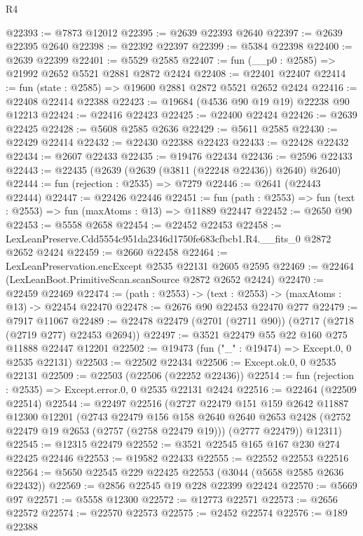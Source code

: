 \begin{lexlean}{R4}
\begin{coremodule}
@22393 := @7873 @12012
@22395 := @2639 @22393 @2640
@22397 := @2639 @22395 @2640
@22398 := @22392 @22397
@22399 := @5384 @22398
@22400 := @2639 @22399
@22401 := @5529 @2585
@22407 := fun (__p0 : @2585) => @21992 @2652 @5521 @2881 @2872 @2424
@22408 := @22401 @22407
@22414 := fun (state : @2585) => @19600 @2881 @2872 @5521 @2652 @2424
@22416 := @22408 @22414 @22388
@22423 := @19684 (@4536 @90 @19 @19) @22238 @90 @12213
@22424 := @22416 @22423
@22425 := @22400 @22424
@22426 := @2639 @22425
@22428 := @5608 @2585 @2636
@22429 := @5611 @2585
@22430 := @22429 @22414
@22432 := @22430 @22388 @22423
@22433 := @22428 @22432
@22434 := @2607 @22433
@22435 := @19476 @22434
@22436 := @2596 @22433
@22443 := @22435 (@2639 (@2639 (@3811 (@22248 @22436)) @2640) @2640)
@22444 := fun (rejection : @2535) => @7279
@22446 := @2641 (@22443 @22444)
@22447 := @22426 @22446
@22451 := fun (path : @2553) => fun (text : @2553) => fun (maxAtoms : @13) => @11889 @22447
@22452 := @2650 @90
@22453 := @5558 @2658
@22454 := @22452 @22453
@22458 := LexLeanPreserve.Cdd5554c951da2346d1750fe683cfbcb1.R4.__fits_0 @2872 @2652 @2424
@22459 := @2660 @22458
@22464 := LexLeanPreservation.encExcept @2535 @22131 @2605 @2595
@22469 := @22464 (LexLeanBoot.PrimitiveScan.scanSource @2872 @2652 @2424)
@22470 := @22459 @22469
@22474 := (path : @2553) -> (text : @2553) -> (maxAtoms : @13) -> @22454 @22470
@22478 := @2676 @90 @22453 @22470 @277
@22479 := @7917 @11067
@22489 := @22478 @22479 (@2701 (@2711 @90)) (@2717 (@2718 (@2719 @277) @22453 @2694))
@22497 := @3521 @22479 @55 @22 @160 @275 @11888 @22447 @12201
@22502 := @19473 (fun ("_" : @19474) => Except.{0, 0} @2535 @22131)
@22503 := @22502 @22434
@22506 := Except.ok.{0, 0} @2535 @22131
@22509 := @22503 (@22506 (@22252 @22436))
@22514 := fun (rejection : @2535) => Except.error.{0, 0} @2535 @22131 @2424
@22516 := @22464 (@22509 @22514)
@22544 := @22497
    @22516
    (@2727
      @22479
      @151
      @159
      @2642
      @11887
      @12300
      @12201
      (@2743
        @22479
        @156
        @158
        @2640
        @2640
        @2653
        @2428
        (@2752 @22479 @19 @2653 (@2757 (@2758 @22479 @19)))
        (@2777 @22479))
      @12311)
@22545 := @12315 @22479
@22552 := @3521 @22545 @165 @167 @230 @274 @22425 @22446
@22553 := @19582 @22433
@22555 := @22552 @22553 @22516
@22564 := @5650 @22545 @229 @22425 @22553 (@3044 (@5658 @2585 @2636 @22432))
@22569 := @2856 @22545 @19 @228 @22399 @22424
@22570 := @5669 @97
@22571 := @5558 @12300
@22572 := @12773 @22571
@22573 := @2656 @22572
@22574 := @22570 @22573
@22575 := @2452 @22574
@22576 := @189 @22388

\end{coremodule}
\end{lexlean}
